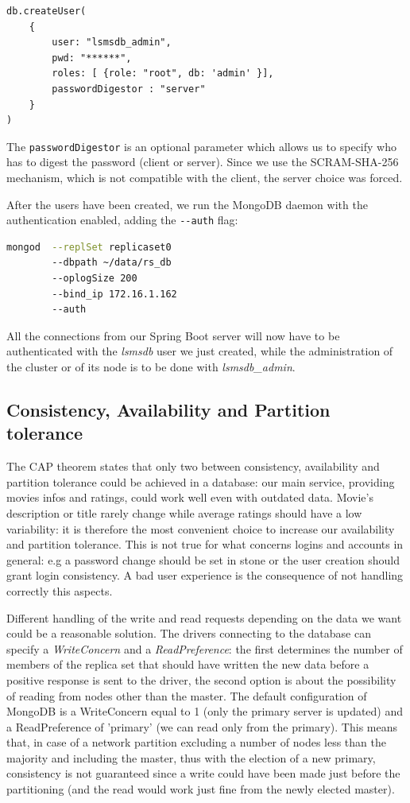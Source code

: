 \documentclass[11pt]{article}
\begin{document}
\begin{lstlisting}
db.createUser(
	{
		user: "lsmsdb_admin",
		pwd: "******",
		roles: [ {role: "root", db: 'admin' }],
		passwordDigestor : "server"
	}
)
\end{lstlisting}

The \lstinline{passwordDigestor} is an optional parameter which allows us to specify who has to digest the password (client or server). Since we use the SCRAM-SHA-256 mechanism, which is not compatible with the client, the server choice was forced.

After the users have been created, we run the MongoDB daemon with the authentication enabled, adding the \lstinline{--auth} flag:

\begin{lstlisting}[language=bash]
mongod 	--replSet replicaset0
		--dbpath ~/data/rs_db
		--oplogSize 200 
		--bind_ip 172.16.1.162
		--auth
\end{lstlisting}

All the connections from our Spring Boot server will now have to be authenticated with the \textit{lsmsdb} user we just created, while the administration of the cluster or of its node is to be done with \textit{lsmsdb\_admin}.

\subsection{Consistency, Availability and Partition tolerance}
The CAP theorem states that only two between consistency, availability and partition tolerance could be achieved in a database: our main service, providing movies infos and ratings, could work well even with outdated data.
Movie's description or title rarely change while average ratings should have a low variability: it is therefore the most convenient choice to increase our availability and partition tolerance.
This is not true for what concerns logins and accounts in general: e.g a password change should be set in stone or the user creation should grant login consistency. A bad user experience is the consequence of not handling correctly this aspects.

Different handling of the write and read requests depending on the data we want could be a reasonable solution.
The drivers connecting to the database can specify a \emph{WriteConcern} and a \emph{ReadPreference}: the first determines the number of members of the replica set that should have written the new data before a positive response is sent to the driver, the second option is about the possibility of reading from nodes other than the master.
The default configuration of MongoDB is a WriteConcern equal to 1 (only the primary server is updated) and a ReadPreference of 'primary' (we can read only from the primary). This means that, in case of a network partition excluding a number of nodes less than the majority and including the master, thus with the election of a new primary, consistency is not guaranteed since a write could have been made just before the partitioning (and the read would work just fine from the newly elected master).
\end{document}
